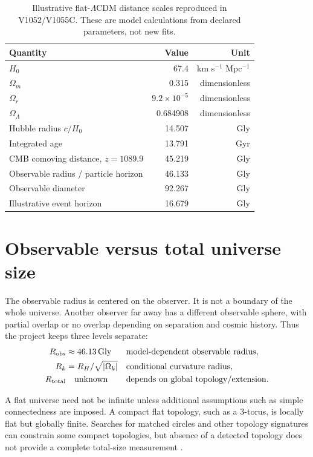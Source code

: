 \documentclass[11pt,a4paper]{article}
\newcommand{\Gly}{\,\mathrm{Gly}}
\begin{document}
\begin{table}[h]
\centering
\caption{Illustrative flat-$\Lambda$CDM distance scales reproduced in V1052/V1055C. These are model calculations from declared parameters, not new fits.}
\begin{tabular}{lrr}
\toprule
Quantity & Value & Unit\\
\midrule
$H_0$ & 67.4 & km s$^{-1}$ Mpc$^{-1}$\\
$\Omega_m$ & 0.315 & dimensionless\\
$\Omega_r$ & $9.2\times10^{-5}$ & dimensionless\\
$\Omega_\Lambda$ & 0.684908 & dimensionless\\
Hubble radius $c/H_0$ & 14.507 & Gly\\
Integrated age & 13.791 & Gyr\\
CMB comoving distance, $z=1089.9$ & 45.219 & Gly\\
Observable radius / particle horizon & 46.133 & Gly\\
Observable diameter & 92.267 & Gly\\
Illustrative event horizon & 16.679 & Gly\\
\bottomrule
\end{tabular}
\end{table}

\section{Observable versus total universe size}
The observable radius is centered on the observer. It is not a boundary of the whole universe. Another observer far away has a different observable sphere, with partial overlap or no overlap depending on separation and cosmic history. Thus the project keeps three levels separate:
\begin{align}
    R_{\rm obs} &\approx 46.13\Gly &&\text{model-dependent observable radius},\\
    R_k &= R_H/\sqrt{|\Omega_k|} &&\text{conditional curvature radius},\\
    R_{\rm total} &\quad \text{unknown} &&\text{depends on global topology/extension}.
\end{align}

A flat universe need not be infinite unless additional assumptions such as simple connectedness are imposed. A compact flat topology, such as a 3-torus, is locally flat but globally finite. Searches for matched circles and other topology signatures can constrain some compact topologies, but absence of a detected topology does not provide a complete total-size measurement \cite{key2006topology}.
\end{document}

